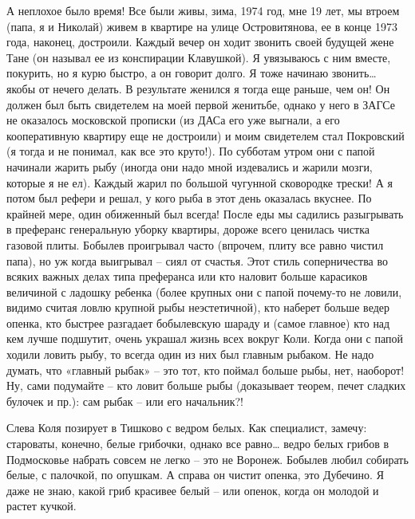  А неплохое было время! Все были живы, зима, 1974 год, мне 19 лет, мы втроем (папа, я и Николай) живем в квартире на улице Островитянова, ее в конце 1973 года, наконец, достроили. Каждый вечер он ходит звонить своей будущей жене Тане (он называл ее из конспирации Клавушкой). Я увязываюсь с ним вместе, покурить, но я курю быстро, а он говорит долго. Я тоже начинаю звонить… якобы от нечего делать. В результате женился я тогда еще раньше, чем он! Он должен был быть свидетелем на моей первой женитьбе, однако у него в ЗАГСе не оказалось московской прописки (из ДАСа его уже выгнали, а его кооперативную квартиру еще не достроили) и моим свидетелем стал Покровский (я тогда и не понимал, как все это круто!). По субботам утром они с папой начинали жарить рыбу (иногда они надо мной издевались и жарили мозги, которые я не ел). Каждый жарил по большой чугунной сковородке трески! А я потом был рефери и решал, у кого рыба в этот день оказалась вкуснее. По крайней мере, один обиженный был всегда! После еды мы садились разыгрывать в преферанс генеральную уборку квартиры, дороже всего ценилась чистка газовой плиты. Бобылев проигрывал часто (впрочем, плиту все равно чистил папа), но уж когда выигрывал – сиял от счастья. Этот стиль соперничества во всяких важных делах типа преферанса или кто наловит больше карасиков величиной с ладошку ребенка (более крупных они с папой почему-то не ловили, видимо считая ловлю крупной рыбы неэстетичной), кто наберет больше ведер опенка, кто быстрее разгадает бобылевскую шараду  и (самое главное) кто над кем лучше подшутит, очень украшал жизнь всех вокруг Коли. Когда они с папой ходили ловить рыбу, то всегда один из них был главным рыбаком. Не надо думать, что «главный рыбак» – это тот, кто поймал больше рыбы, нет, наоборот! Ну, сами подумайте – кто ловит больше рыбы (доказывает теорем, печет сладких булочек и пр.): сам рыбак – или его начальник?!
 
 	     Слева Коля позирует в Тишково с ведром белых. Как специалист, замечу: староваты, конечно, белые грибочки, однако все равно… ведро белых грибов в Подмосковье набрать совсем не легко – это не Воронеж. Бобылев любил собирать белые, с палочкой, по опушкам. А справа он чистит опенка, это Дубечино. Я даже не знаю, какой гриб красивее белый – или опенок, когда он молодой и растет кучкой. 	
 
